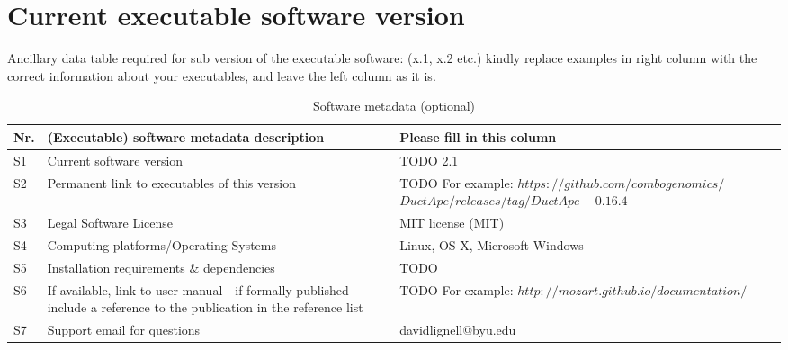 \documentclass[preprint,12pt, a4paper]{elsarticle}
\begin{document}




 
 

\section*{Current executable software version}
\label{}

Ancillary data table required for sub version of the executable software: (x.1, x.2 etc.) kindly replace examples in right column with the correct information about your executables, and leave the left column as it is.

\begin{table}[!h]
\begin{tabular}{|l|p{6.5cm}|p{6.5cm}|}
\hline
\textbf{Nr.} & \textbf{(Executable) software metadata description} & \textbf{Please fill in this column} \\
\hline
S1 & Current software version & TODO 2.1 \\
\hline
S2 & Permanent link to executables of this version  & TODO For example: $https://github.com/combogenomics/$ $DuctApe/releases/tag/DuctApe-0.16.4$ \\
\hline
S3 & Legal Software License & MIT license (MIT) \\
\hline
S4 & Computing platforms/Operating Systems & Linux, OS X, Microsoft Windows\\
\hline
S5 & Installation requirements \& dependencies & TODO \\
\hline
S6 & If available, link to user manual - if formally published include a reference to the publication in the reference
    list & TODO For example: $http://mozart.github.io/documentation/$ \\
\hline
S7 & Support email for questions & davidlignell@byu.edu \\
\hline
\end{tabular}
\caption{Software metadata (optional)}
\label{} 
\end{table}
\end{document}
